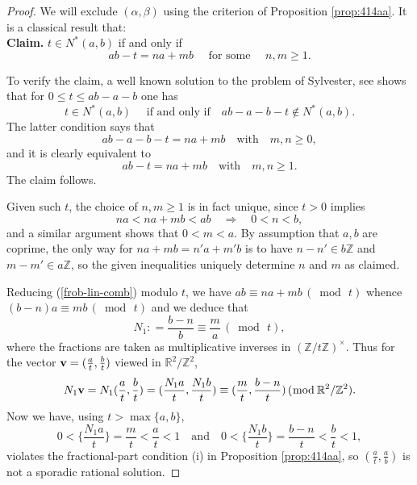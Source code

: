 \documentclass[12pt,letterpaper, reqno]{amsart}
\theoremstyle{definition}
\theoremstyle{remark}
\newcommand{\RR}{\ensuremath{\mathbb{R}}}
\newcommand{\ZZ}{\ensuremath{\mathbb{Z}}}
\newcommand{\bv}{{\bf v}}
\begin{document}
\begin{proof}
We will exclude $(\alpha, \beta)$ using  the criterion of Proposition \ref{prop:414aa}.
It is a classical result that:\\

{\bf Claim.} $ t \in N^{\ast}(a,b) $ if and only if
\begin{equation}\label{frob-lin-comb}
ab-t = na + mb \quad \text{ for some } \quad n,m\geq 1.
\end{equation}

To verify the claim, a well known solution to the problem of Sylvester, see \cite[pp. 103--105]{RA05}  shows that
for $0 \le t \le ab-a-b$ one has
\[
  t \in N^{\ast}(a, b) \quad \mbox{ if and only if}\quad  ab-a -b -t \not\in N^{\ast}(a, b).
\]
The latter condition says that 
$$
ab-a-b-t= na+ mb \quad \mbox{with} \quad  m, n \ge 0,
$$
and it  is clearly equivalent to 
$$
ab-t= na+ mb \quad \mbox{with} \quad  m, n \ge 1.
$$
The claim follows. 



Given such $t$, the choice of $n,m \ge 1$ is in fact unique, since $t>0$ implies
\[ 
na < na+mb < ab \quad\Rightarrow\quad 0< n < b,
\]
and a similar argument shows that
 $0<m < a$. 
 By assumption that $a,b$ are coprime, the only way for $na + mb = n'a + m'b$ is to have  $n-n' \in b\ZZ$ and $m-m'\in a\ZZ$, 
 so the given inequalities uniquely determine $n$ and $m$ as claimed.

Reducing (\ref{frob-lin-comb}) modulo $t$, we have
$ 
ab \equiv na + mb \,(\bmod\, t )
$
whence 
$
(b-n)a \equiv mb \, (\bmod \, t) 
$
and we deduce that 
 $$
 N_1: = \frac{b-n}{b} \equiv \frac{m}{a}  \, (\bmod \,t),
 $$
where the fractions are taken as  multiplicative inverses in $(\ZZ/t\ZZ)^\times$. Thus for 
the vector $\bv =(\frac{a}{t}, \frac{b}{t})$
viewed in $\RR^2/\ZZ^2$, 
\[ 
N_1 \bv = N_1(\frac{a}{t},\frac{b}{t}) = (\frac{N_1a}{t}, \frac{N_1b}{t}) \equiv  (\frac{m}{t}, \frac{b-n}{t}) \, (\bmod \, \RR^2/\ZZ^2).
\]
Now we have, using $t > \max \{ a, b\}$, 
\[ 
0< \{\frac{N_1a}{t} \} = \frac{m}{t} < \frac{a}{t} < 1 \quad\text{and}\quad 0< \{\frac{N_1b}{t}\} = \frac{b-n}{t }< \frac{b}{t} <1,
\]
 violates the fractional-part condition (i)  in Proposition \ref{prop:414aa}, so $(\frac{a}{t}, \frac{a}{b})$ is not a sporadic rational solution. 
\end{proof}
\end{document}
